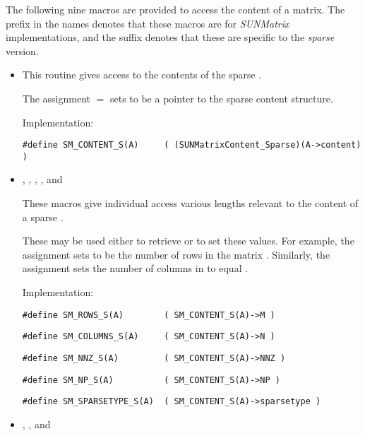 \noindent The following nine macros are provided to access the
content of a {\sunmatsparse} matrix. The prefix  in the names
denotes that these macros are for \emph{SUNMatrix} implementations,
and the suffix  denotes that these are specific to
the \emph{sparse} version.
\begin{itemize}

\item {}
    
  This routine gives access to the contents of the
  sparse .
  
  The assignment  $=$  sets           
   to be a pointer to the sparse  content  
  structure.                                             
                                                            
  Implementation: 
  
  \verb|#define SM_CONTENT_S(A)     ( (SUNMatrixContent_Sparse)(A->content) )|
  
\item {}, , , , and 

  These macros give individual access various lengths relevant to the
  content of a sparse .
                                                               
  These may be used either to retrieve or to set these values.  For
  example, the assignment  sets  to be
  the number of rows in the matrix .  Similarly, the
  assignment  sets the number of
  columns in  to equal .
  
  Implementation: 
  
  \verb|#define SM_ROWS_S(A)        ( SM_CONTENT_S(A)->M )|

  \verb|#define SM_COLUMNS_S(A)     ( SM_CONTENT_S(A)->N )|

  \verb|#define SM_NNZ_S(A)         ( SM_CONTENT_S(A)->NNZ )|

  \verb|#define SM_NP_S(A)          ( SM_CONTENT_S(A)->NP )|

  \verb|#define SM_SPARSETYPE_S(A)  ( SM_CONTENT_S(A)->sparsetype )|


\item {}, , and 
                                                            

\end{itemize}
